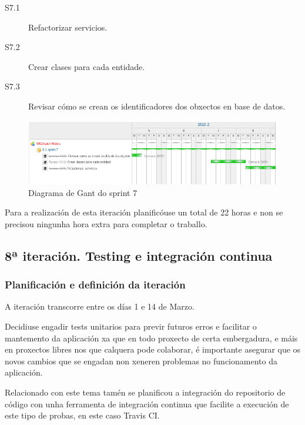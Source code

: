         \begin{description}
         \item [S7.1] Refactorizar servicios.
         \item [S7.2] Crear clases para cada entidade.
         \item [S7.3] Revisar cómo se crean os identificadores dos obxectos en 
base de datos.
        \end{description}

        \begin{figure}[h!]
          \begin{center}
          \includegraphics[width=\textwidth]{./img/gant_diagrams/07.png}
          \caption{Diagrama de Gant do sprint 7}
          \label{fig:gant07}
          \end{center}
        \end{figure}

    Para a realización de esta iteración planificóuse un total de 22 horas e 
non se precisou ningunha hora extra para completar o traballo.

    \subsection{8ª iteración. Testing e integración continua}

      \subsubsection{Planificación e definición da iteración}
      A iteración transcorre entre os días 1 e 14 de Marzo.

      Decidiuse engadir tests unitarios para previr futuros erros e facilitar o 
mantemento da aplicación xa que en todo proxecto de certa embergadura, e máis 
en proxectos libres nos que calquera pode colaborar, é importante asegurar que 
os novos cambios que se engadan non xeneren problemas no funcionamento da 
aplicación.

      Relacionado con este tema tamén se planificou a integración do 
repositorio de código con unha ferramenta de integración continua que facilite 
a execución de este tipo de probas, en este caso Travis CI.

